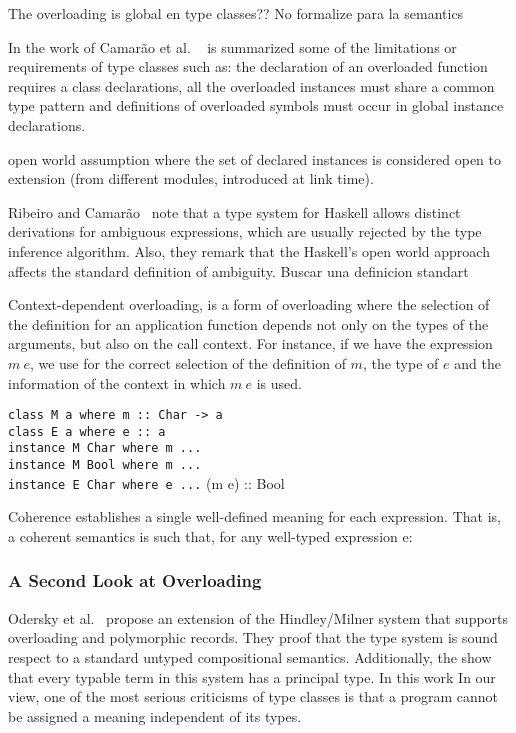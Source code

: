 \documentclass[hidelinks, twocolumn]{article}
\begin{document}
The overloading is global en type classes??
 No formalize para la semantics
 
In the work of Camar\~ao et al. ~\cite{Camarao1999} is summarized some of the limitations or requirements of type classes such as: the declaration of an overloaded function requires a class declarations, all the overloaded instances must share a common type pattern and definitions of overloaded symbols must occur in global instance declarations.

open world assumption where the
set of declared instances is considered open to extension (from different modules,
introduced at link time).


Ribeiro and Camar\~ao~\cite{Ribeiro2013} note that a type system for Haskell allows distinct derivations for ambiguous expressions, which are usually rejected by the type inference algorithm. Also, they remark that the Haskell's open world approach affects the standard definition of ambiguity. Buscar una definicion standart


Context-dependent overloading, is a form of overloading where the selection of the definition for an application function depends not only on the types of the arguments, but also on the call context. For instance,  if we have the  expression $m \ e$, we use for the correct selection of the definition of $m$, the type of $e$ and the information of the context in which  $m \ e$ is used.

\texttt{class M a where m :: Char -> a\\
class E a where e :: a\\
instance M Char where m ...\\
instance M Bool where m ...\\
instance E Char where e ...}
(m e) :: Bool


Coherence establishes a single well-defined meaning for each expression. That is, a coherent semantics is such that, for any well-typed expression e:


\subsubsection{A Second Look at Overloading}
Odersky et al.~\cite{Odersky1995} propose an extension of the Hindley/Milner system that supports overloading and polymorphic records. They proof that the type system is sound respect to a standard untyped compositional semantics. Additionally, the show  that
every typable term in this system has  a principal type. In this work 
In our view, one of the most serious criticisms of type classes is that a program cannot be assigned a meaning independent of its types.
\end{document}
